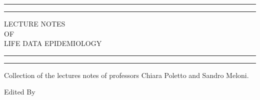 \begin{titlepage} %

	\centering %
	
	\scshape %
	
	\vspace*{\baselineskip} %
	
	
	\rule{\textwidth}{1.6pt}\vspace*{-\baselineskip}\vspace*{2pt} %
	\rule{\textwidth}{0.4pt} %
	
	\vspace{0.75\baselineskip} %
	
	{\LARGE LECTURE NOTES\\ OF\\ LIFE DATA EPIDEMIOLOGY \\} %
	
	\vspace{0.75\baselineskip} %
	
	\rule{\textwidth}{0.4pt}\vspace*{-\baselineskip}\vspace{3.2pt} %
	\rule{\textwidth}{1.6pt} %
	
	\vspace{2\baselineskip} %
	
	
	Collection of the lectures notes of professors Chiara Poletto and Sandro Meloni. %
	
	\vspace*{3\baselineskip} %
	
	
	Edited By
	
	\vspace{0.5\baselineskip} %
	

\end{titlepage}
